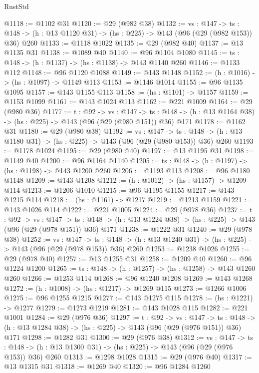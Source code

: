 \begin{lexlean}{RustStd}
\begin{coremodule}
@1118 := @1102 @31
@1120 := @29 (@982 @38)
@1132 := {vs : @147} ->
  {ts : @148} -> (h : @13 @1120 @31) -> (hs : @225) -> @143 (@96 (@29 (@982 @153)) @36) @260
@1133 := @1118 @1022
@1135 := @29 (@982 @40)
@1137 := @13 @1135 @31
@1138 := @1089 @40
@1140 := @96 @1104 @1080
@1145 := {ts : @148} -> (h : @1137) -> (hs : @1138) -> @143 @1140 @260
@1146 := @1133 @112
@1148 := @96 @1120 @1088
@1149 := @143 @1148
@1152 := (h : @1016) -> (hs : @1097) -> @1149 @113
@1153 := @1146 @1014
@1155 := @96 @1135 @1095
@1157 := @143 @1155 @113
@1158 := (hs : @1101) -> @1157
@1159 := @1153 @1099
@1161 := @143 @1024 @113
@1162 := @221 @1009
@1164 := @29 (@980 @36)
@1177 := {t : @92} ->
  {vs : @147} ->
  {ts : @148} -> (h : @13 @1164 @38) -> (hs : @225) -> @143 (@96 (@29 (@980 @151)) @36) @171
@1178 := @1162 @31
@1180 := @29 (@980 @38)
@1192 := {vs : @147} ->
  {ts : @148} -> (h : @13 @1180 @31) -> (hs : @225) -> @143 (@96 (@29 (@980 @153)) @36) @260
@1193 := @1178 @1024
@1195 := @29 (@980 @40)
@1197 := @13 @1195 @31
@1198 := @1149 @40
@1200 := @96 @1164 @1140
@1205 := {ts : @148} -> (h : @1197) -> (hs : @1198) -> @143 @1200 @260
@1206 := @1193 @113
@1208 := @96 @1180 @1148
@1209 := @143 @1208
@1212 := (h : @1012) -> (hs : @1157) -> @1209 @114
@1213 := @1206 @1010
@1215 := @96 @1195 @1155
@1217 := @143 @1215 @114
@1218 := (hs : @1161) -> @1217
@1219 := @1213 @1159
@1221 := @143 @1026 @114
@1222 := @221 @1005
@1224 := @29 (@978 @36)
@1237 := {t : @92} ->
  {vs : @147} ->
  {ts : @148} -> (h : @13 @1224 @38) -> (hs : @225) -> @143 (@96 (@29 (@978 @151)) @36) @171
@1238 := @1222 @31
@1240 := @29 (@978 @38)
@1252 := {vs : @147} ->
  {ts : @148} -> (h : @13 @1240 @31) -> (hs : @225) -> @143 (@96 (@29 (@978 @153)) @36) @260
@1253 := @1238 @1026
@1255 := @29 (@978 @40)
@1257 := @13 @1255 @31
@1258 := @1209 @40
@1260 := @96 @1224 @1200
@1265 := {ts : @148} -> (h : @1257) -> (hs : @1258) -> @143 @1260 @260
@1266 := @1253 @114
@1268 := @96 @1240 @1208
@1269 := @143 @1268
@1272 := (h : @1008) -> (hs : @1217) -> @1269 @115
@1273 := @1266 @1006
@1275 := @96 @1255 @1215
@1277 := @143 @1275 @115
@1278 := (hs : @1221) -> @1277
@1279 := @1273 @1219
@1281 := @143 @1028 @115
@1282 := @221 @1001
@1284 := @29 (@976 @36)
@1297 := {t : @92} ->
  {vs : @147} ->
  {ts : @148} -> (h : @13 @1284 @38) -> (hs : @225) -> @143 (@96 (@29 (@976 @151)) @36) @171
@1298 := @1282 @31
@1300 := @29 (@976 @38)
@1312 := {vs : @147} ->
  {ts : @148} -> (h : @13 @1300 @31) -> (hs : @225) -> @143 (@96 (@29 (@976 @153)) @36) @260
@1313 := @1298 @1028
@1315 := @29 (@976 @40)
@1317 := @13 @1315 @31
@1318 := @1269 @40
@1320 := @96 @1284 @1260

\end{coremodule}
\end{lexlean}
